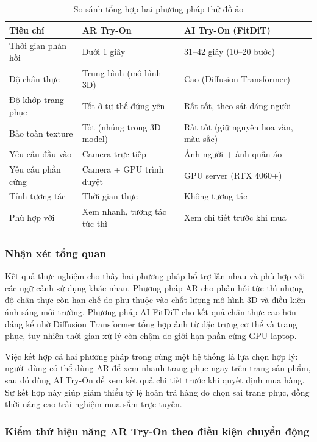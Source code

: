 \begin{table}[H]
\centering
\caption{So sánh tổng hợp hai phương pháp thử đồ ảo}
\label{tab:tryon_compare}
\begin{tabular}{|p{3.5cm}|p{4cm}|p{4cm}|}
\hline
\textbf{Tiêu chí} & \textbf{AR Try-On} & \textbf{AI Try-On (FitDiT)} \\
\hline
Thời gian phản hồi & Dưới 1 giây & 31--42 giây (10--20 bước) \\
\hline
Độ chân thực & Trung bình (mô hình 3D) & Cao (Diffusion Transformer) \\
\hline
Độ khớp trang phục & Tốt ở tư thế đứng yên & Rất tốt, theo sát dáng người \\
\hline
Bảo toàn texture & Tốt (nhúng trong 3D model) & Rất tốt (giữ nguyên hoa văn, màu sắc) \\
\hline
Yêu cầu đầu vào & Camera trực tiếp & Ảnh người + ảnh quần áo \\
\hline
Yêu cầu phần cứng & Camera + GPU trình duyệt & GPU server (RTX 4060+) \\
\hline
Tính tương tác & Thời gian thực & Không tương tác \\
\hline
Phù hợp với & Xem nhanh, tương tác tức thì & Xem chi tiết trước khi mua \\
\hline
\end{tabular}
\end{table}

\subsubsection{Nhận xét tổng quan}

Kết quả thực nghiệm cho thấy hai phương pháp bổ trợ lẫn nhau và phù
hợp với các ngữ cảnh sử dụng khác nhau. Phương pháp AR cho phản hồi
tức thì nhưng độ chân thực còn hạn chế do phụ thuộc vào chất lượng
mô hình 3D và điều kiện ánh sáng môi trường. Phương pháp AI FitDiT
cho kết quả chân thực cao hơn đáng kể nhờ Diffusion Transformer tổng
hợp ảnh từ đặc trưng cơ thể và trang phục, tuy nhiên thời gian xử lý
còn chậm do giới hạn phần cứng GPU laptop.

Việc kết hợp cả hai phương pháp trong cùng một hệ thống là lựa chọn
hợp lý: người dùng có thể dùng AR để xem nhanh trang phục ngay trên
trang sản phẩm, sau đó dùng AI Try-On để xem kết quả chi tiết trước
khi quyết định mua hàng. Sự kết hợp này giúp giảm thiểu tỷ lệ hoàn
trả hàng do chọn sai trang phục, đồng thời nâng cao trải nghiệm mua
sắm trực tuyến.
\subsubsection{Kiểm thử hiệu năng AR Try-On theo điều kiện chuyển động}


